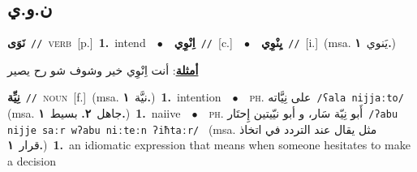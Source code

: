 \documentclass[10pt,a4paper,twoside]{article} %
\begin{document}
\begin{multicols}{2}
\vspace{-3mm}
\subsection*{\color{blue}\foreignlanguage{arabic}{ن.و.ي}\color{blue}{}} 

{\setlength\topsep{0pt}\textbf{\foreignlanguage{arabic}{نَوَى}}\ {\color{gray}\texttt{//}\color{black}}\ \textsc{verb}\ [p.]\ \textbf{1.}~intend\ \ $\bullet$\ \ \setlength\topsep{0pt}\textbf{\foreignlanguage{arabic}{اِنْوِي}}\ {\color{gray}\texttt{//}\color{black}}\ [c.]\ \ $\bullet$\ \ \setlength\topsep{0pt}\textbf{\foreignlanguage{arabic}{يِنْوِي}}\ {\color{gray}\texttt{//}\color{black}}\ [i.]\ \color{gray}(msa. \foreignlanguage{arabic}{يَنوي}~\foreignlanguage{arabic}{\textbf{١.}})\color{black}\  \begin{flushright}\color{gray}\foreignlanguage{arabic}{\textbf{\underline{\foreignlanguage{arabic}{أمثلة}}}: أنت اِنْوِي خير وشوف شو رح يصير}\end{flushright}\color{black}} \vspace{2mm}

{\setlength\topsep{0pt}\textbf{\foreignlanguage{arabic}{نِيِّة}}\ {\color{gray}\texttt{//}\color{black}}\ \textsc{noun}\ [f.]\ \color{gray}(msa. \foreignlanguage{arabic}{نيَّة}~\foreignlanguage{arabic}{\textbf{١.}})\color{black}\ \textbf{1.}~intention\ \ $\bullet$\ \ \textsc{ph.} \color{gray} \foreignlanguage{arabic}{على نِيَّاته}\color{black}\ {\color{gray}\texttt{/{\sffamily ʕala nijjaːto}/}\color{black}}\ \color{gray} (msa. \foreignlanguage{arabic}{جاهل}~\foreignlanguage{arabic}{\textbf{٢.}}  \foreignlanguage{arabic}{بسيط}~\foreignlanguage{arabic}{\textbf{١.}})\color{black}\ \textbf{1.}~naiive\ \ $\bullet$\ \ \textsc{ph.} \color{gray} \foreignlanguage{arabic}{أَبو نِيّة سَار، و أبو نيّيتين إِحتَار}\color{black}\ {\color{gray}\texttt{/{\sffamily ʔabu nijje saːr wʔabu niːteːn ʔiħtaːr}/}\color{black}}\ \color{gray} (msa. \foreignlanguage{arabic}{مثل يقال عند التردد في اتخاذ قرار}~\foreignlanguage{arabic}{\textbf{١.}})\color{black}\ \textbf{1.}~an idiomatic expression that means when someone hesitates to make a decision\ } \vspace{2mm}


\end{multicols}
\end{document}
